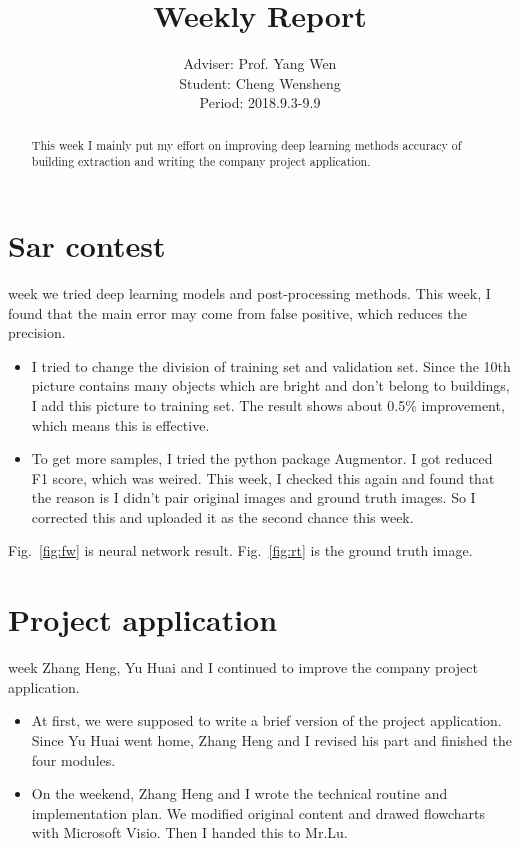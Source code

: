 \documentclass[]{IEEEtran}
\begin{document}
	\title{Weekly Report}
	\author{Adviser: Prof. Yang Wen \\Student: Cheng Wensheng\\ Period: 2018.9.3-9.9
	}
	\maketitle

\begin{abstract}
	This week I mainly put my effort on improving deep learning methods accuracy of building extraction and writing the company project application.
\end{abstract}

\section{Sar contest}
	 week we tried deep learning models and post-processing methods. This week, I found that the main error may come from false positive, which reduces the precision.
	\begin{itemize}
		\item I tried to change the division of training set and validation set. Since the 10th picture contains many objects which are bright and don't belong to buildings, I add this picture to training set. The result shows about 0.5$\%$ improvement, which means this is effective.
		\item To get more samples, I tried the python package Augmentor. I got reduced F1 score, which was weired. This week, I checked this again and found that the reason is I didn't pair original images and ground truth images. So I corrected this and uploaded it as the second chance this week.
	\end{itemize}
	
	Fig.~\ref{fig:fw} is neural network result. Fig.~\ref{fig:rt} is the ground truth image.


\section{Project application}
 week Zhang Heng, Yu Huai and I continued to improve the company project application. 
\begin{itemize}
	\item At first, we were supposed to write a brief version of the project application. Since Yu Huai went home, Zhang Heng and I revised his part and finished the four modules.
	\item On the weekend, Zhang Heng and I wrote the technical routine and implementation plan. We modified original content and drawed flowcharts with Microsoft Visio. Then I handed this to Mr.Lu.
	
\end{itemize}
\end{document}

